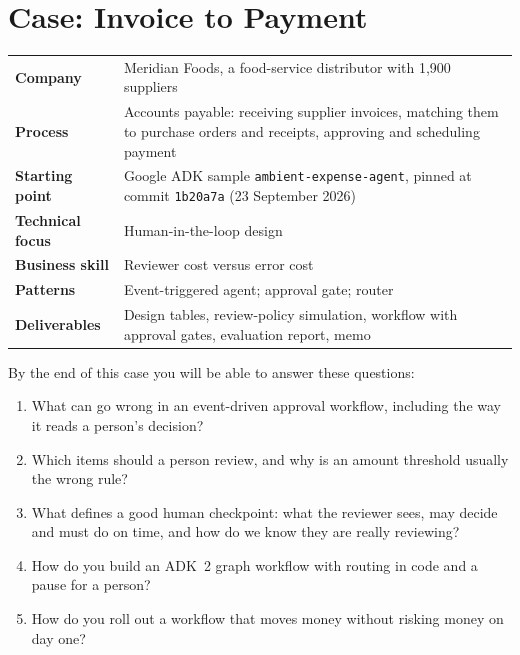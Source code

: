
\chapter{Case: Invoice to Payment}
\label{ch:case-invoice}

\begin{caseglance}
\begin{tabularx}{\linewidth}{@{}>{\bfseries}p{3.4cm}X@{}}
Company & Meridian Foods, a food-service distributor with 1{,}900 suppliers \\
Process & Accounts payable: receiving supplier invoices, matching them to purchase orders and receipts, approving and scheduling payment \\
Starting point & Google ADK sample \texttt{ambient-expense-agent}, pinned at commit \texttt{1b20a7a} (23 September 2026) \\
Technical focus & Human-in-the-loop design \\
Business skill & Reviewer cost versus error cost \\
Patterns & Event-triggered agent; approval gate; router \\
Deliverables & Design tables, review-policy simulation, workflow with approval gates, evaluation report, memo
\end{tabularx}
\end{caseglance}

\begin{chapterquestions}
By the end of this case you will be able to answer these questions:
\begin{enumerate}[leftmargin=*,itemsep=2pt]
  \item What can go wrong in an event-driven approval workflow, including the way it reads a person's decision?
  \item Which items should a person review, and why is an amount threshold usually the wrong rule?
  \item What defines a good human checkpoint: what the reviewer sees, may decide and must do on time, and how do we know they are really reviewing?
  \item How do you build an ADK~2 graph workflow with routing in code and a pause for a person?
  \item How do you roll out a workflow that moves money without risking money on day one?
\end{enumerate}
\end{chapterquestions}

